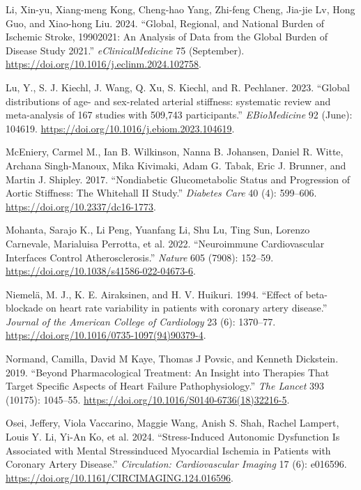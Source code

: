 \documentclass[
  a4paper,
  headsepline=true,
  open=any]{scrbook}
\newlength{\cslhangindent}
\newlength{\cslentryspacingunit} %
\newenvironment{CSLReferences}[2] %
 {%
  \setlength{\parindent}{0pt}
  \ifodd #1
  \let\oldpar\par
  \def\par{\hangindent=\cslhangindent\oldpar}
  \fi
  \setlength{\parskip}{#2\cslentryspacingunit}
 }%
 {}
\begin{document}
\begin{CSLReferences}{1}{0}
\leavevmode{}%
Li, Xin-yu, Xiang-meng Kong, Cheng-hao Yang, Zhi-feng Cheng, Jia-jie Lv,
Hong Guo, and Xiao-hong Liu. 2024. {``Global, Regional, and National
Burden of Ischemic Stroke, 1990{\textendash}2021: An Analysis of Data
from the Global Burden of Disease Study 2021.''}
\emph{eClinicalMedicine} 75 (September).
\url{https://doi.org/10.1016/j.eclinm.2024.102758}.

\leavevmode{}%
Lu, Y., S. J. Kiechl, J. Wang, Q. Xu, S. Kiechl, and R. Pechlaner. 2023.
{``Global distributions of age- and sex-related arterial stiffness:
systematic review and meta-analysis of 167 studies with 509,743
participants.''} \emph{EBioMedicine} 92 (June): 104619.
\url{https://doi.org/10.1016/j.ebiom.2023.104619}.

\leavevmode{}%
McEniery, Carmel M., Ian B. Wilkinson, Nanna B. Johansen, Daniel R.
Witte, Archana Singh-Manoux, Mika Kivimaki, Adam G. Tabak, Eric J.
Brunner, and Martin J. Shipley. 2017. {``Nondiabetic Glucometabolic
Status and Progression of Aortic Stiffness: The Whitehall II Study.''}
\emph{Diabetes Care} 40 (4): 599--606.
\url{https://doi.org/10.2337/dc16-1773}.

\leavevmode{}%
Mohanta, Sarajo K., Li Peng, Yuanfang Li, Shu Lu, Ting Sun, Lorenzo
Carnevale, Marialuisa Perrotta, et al. 2022. {``Neuroimmune
Cardiovascular Interfaces Control Atherosclerosis.''} \emph{Nature} 605
(7908): 152--59. \url{https://doi.org/10.1038/s41586-022-04673-6}.

\leavevmode{}%
Niemelä, M. J., K. E. Airaksinen, and H. V. Huikuri. 1994. {``Effect of
beta-blockade on heart rate variability in patients with coronary artery
disease.''} \emph{Journal of the American College of Cardiology} 23 (6):
1370--77. \url{https://doi.org/10.1016/0735-1097(94)90379-4}.

\leavevmode{}%
Normand, Camilla, David M Kaye, Thomas J Povsic, and Kenneth Dickstein.
2019. {``Beyond Pharmacological Treatment: An Insight into Therapies
That Target Specific Aspects of Heart Failure Pathophysiology.''}
\emph{The Lancet} 393 (10175): 1045--55.
\url{https://doi.org/10.1016/S0140-6736(18)32216-5}.

\leavevmode{}%
Osei, Jeffery, Viola Vaccarino, Maggie Wang, Anish S. Shah, Rachel
Lampert, Louis Y. Li, Yi-An Ko, et al. 2024. {``Stress-Induced Autonomic
Dysfunction Is Associated with Mental Stress{\textendash}induced
Myocardial Ischemia in Patients with Coronary Artery Disease.''}
\emph{Circulation: Cardiovascular Imaging} 17 (6): e016596.
\url{https://doi.org/10.1161/CIRCIMAGING.124.016596}.


\end{CSLReferences}
\end{document}

